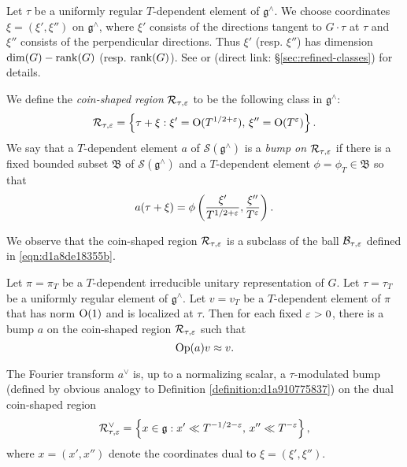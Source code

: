 \documentclass[reqno]{amsart} 
\numberwithin{equation}{section}
\numberwithin{theorem}{section}
\begin{document}
\begin{definition}
  Let $\tau$ be a uniformly regular $T$-dependent element of $\mathfrak{g}^\wedge$.  We choose coordinates $\xi = (\xi ', \xi '')$ on $\mathfrak{g}^\wedge$, where $\xi '$ consists of the directions tangent to $G \cdot \tau$ at $\tau$ and $\xi ''$ consists of the perpendicular directions.  Thus $\xi'$ (resp. $\xi ''$) has dimension $\dim(G) - \operatorname{rank}(G)$ (resp. $\operatorname{rank}(G)$).  See \cite[\S9.4.1]{2020arXiv201202187N} or \cite[\S13.3.4]{2021arXiv210915230N} (direct link: \S\ref{sec:refined-classes}) for details.

  We define the \emph{coin-shaped region} $\mathcal{R} _{\tau,\varepsilon}$ to be the following class in $\mathfrak{g}^\wedge$:
  \begin{equation*}
\mathcal{R}_{\tau,\varepsilon} = \left\{ \tau + \xi : \xi ' = \operatorname{O}(T^{1/2+\varepsilon}), \, \xi '' = \operatorname{O}(T^{\varepsilon}) \right\}.
\end{equation*}
We say that a $T$-dependent element $a$ of $\mathcal{S}(\mathfrak{g}^\wedge)$ is a \emph{bump on} $\mathcal{R}_{\tau,\varepsilon}$ if there is a fixed bounded subset $\mathfrak{B}$ of $\mathcal{S}(\mathfrak{g}^\wedge)$ and a $T$-dependent element $\phi = \phi_T \in \mathfrak{B}$ so that
\begin{equation*}
a(\tau + \xi ) = \phi\left(\frac{\xi ' }{ T^{1/2+\varepsilon}}, \frac{\xi '' }{ T^\varepsilon}\right).
\end{equation*}
\end{definition}
We observe that the coin-shaped region $\mathcal{R}_{\tau,\varepsilon}$ is a subclass of the ball $\mathcal{B}_{\tau,\varepsilon}$ defined in \eqref{eqn:d1a8de18355b}.

\begin{theorem}
  Let $\pi = \pi_T$ be a $T$-dependent irreducible unitary representation of $G$.  Let $\tau = \tau_T$ be a uniformly regular element of $\mathfrak{g}^\wedge$.  Let $v = v_T$ be a $T$-dependent element of $\pi$ that has norm $\operatorname{O}(1)$ and is localized at $\tau$.  Then for each fixed $\varepsilon > 0$, there is a bump $a$ on the coin-shaped region $\mathcal{R}_{\tau,\varepsilon}$ such that
  \begin{equation*}
    \operatorname{Op}(a) v \approx v.
  \end{equation*}
\end{theorem}

\begin{remark}
  The Fourier transform $a^\vee$ is, up to a normalizing scalar, a $\tau$-modulated bump (defined by obvious analogy to Definition \ref{definition:d1a910775837}) on the dual coin-shaped region
  \begin{equation*}
    \mathcal{R}_{\tau,\varepsilon}^\vee = \left\{ x \in \mathfrak{g} : x ' \ll T^{-1/2-\varepsilon}, \, x '' \ll T^{-\varepsilon} \right\},
  \end{equation*}
  where $x = (x', x'')$ denote the coordinates dual to $\xi = (\xi ', \xi '')$.
\end{remark}
\end{document}
